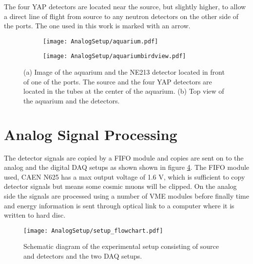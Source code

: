 \documentclass[main.tex]{subfiles}
\begin{document}
The four YAP detectors are located near the source, but slightly higher, to allow a direct line of flight from source to any neutron detectors on the other side of the ports. The one used in this work is marked with an arrow.
\begin{figure}[ht]
	\center
	\begin{subfigure}[b]{0.49\textwidth}
	    \centering
    	    \texttt{[image: AnalogSetup/aquarium.pdf]}
        	\caption[Aquarium 3D]{}
	    \label{fig:aquarium_pers} 
	\end{subfigure}
	\begin{subfigure}[b]{0.49\textwidth}
	    \centering
    	    \texttt{[image: AnalogSetup/aquariumbirdview.pdf]}
        	\caption[Aquarium 2D, top view]{}
	    \label{fig:aquarium_bird} 
	\end{subfigure}
	\caption[CAD drawing of the aqurium]{(a) Image of the aquarium and the NE213 detector located in front of one of the ports. The source and the four YAP detectors are located in the tubes at the center of the aquarium. (b) Top view of the aquarium and the detectors.}
	\label{fig:aquarium}
\end{figure}

\section{Analog Signal Processing}
The detector signals are copied by a FIFO module and copies are sent on to the analog and the digital DAQ setups as shown shown in figure \ref{fig:setup}. The FIFO module used, CAEN N625 has a max output voltage of 1.6 V, which is sufficient to copy detector signals but means some cosmic muons will be clipped.  On the analog side the signals are processed using a number of VME modules before finally time and energy information is sent through optical link to a computer where it is written to hard disc. 

\begin{figure}[h]
    \centering
        \texttt{[image: AnalogSetup/setup\_flowchart.pdf]}
        \caption[Diagram of experimental setup]{Schematic diagram of the experimental setup consisting of source and detectors and the two DAQ setups.}
    \label{fig:setup}
\end{figure}
\end{document}
